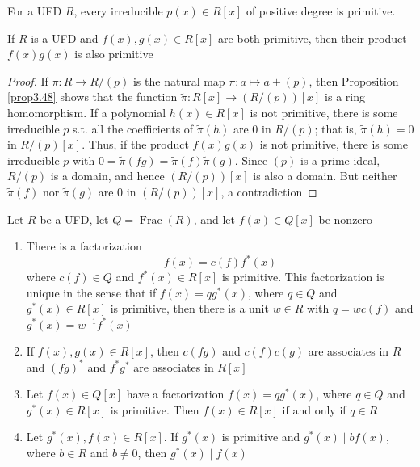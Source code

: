\documentclass[11pt]{article}
\DeclareMathOperator{\Frac}{Frac}
\begin{document}
\begin{examplle}[]
For a UFD \(R\), every irreducible \(p(x)\in R[x]\) of positive degree is
primitive. 
\end{examplle}

\begin{lemma}
If \(R\) is a UFD and \(f(x),g(x)\in R[x]\) are both primitive, then their
product \(f(x)g(x)\) is also primitive
\end{lemma}

\begin{proof}
If \(\pi:R\to R/(p)\) is the natural map \(\pi:a\mapsto a+(p)\), then Proposition
\ref{prop3.48} shows that the function \(\widetilde{\pi}:R[x]\to(R/(p))[x]\) is a
ring homomorphism. If a polynomial \(h(x)\in R[x]\) is not primitive, there is
some irreducible \(p\) s.t. all the coefficients of \(\widetilde{\pi}(h)\) are 0
in \(R/(p)\); that is, \(\widetilde{\pi}(h)=0\) in \(R/(p)[x]\). Thus, if the
product \(f(x)g(x)\) is not primitive, there is some irreducible \(p\) with 
\(0=\widetilde{\pi}(fg)=\widetilde{\pi}(f)\widetilde{\pi}(g)\). Since \((p)\) is a
prime ideal, \(R/(p)\) is a domain, and hence \((R/(p))[x]\) is also a
domain. But neither \(\widetilde{\pi}(f)\) nor \(\widetilde{\pi}(g)\) are 0 in
\((R/(p))[x]\), a contradiction
\end{proof}

\begin{lemma}[]
\label{lemma6.24}
Let \(R\) be a UFD, let \(Q=\Frac(R)\), and let \(f(x)\in Q[x]\) be nonzero
\begin{enumerate}
\item There is a factorization
\begin{equation*}
f(x)=c(f)f^*(x)
\end{equation*}
where \(c(f)\in Q\) and \(f^*(x)\in R[x]\) is primitive. This
factorization is unique in the sense that if \(f(x)=qg^*(x)\), where
\(q\in Q\) and \(g^*(x)\in R[x]\) is primitive, then there is a unit 
\(w\in R\) with \(q=wc(f)\) and \(g^*(x)=w^{-1}f^*(x)\)
\item If \(f(x),g(x)\in R[x]\), then \(c(fg)\) and \(c(f)c(g)\) are associates
in \(R\) and \((fg)^*\) and \(f^*g^*\) are associates in \(R[x]\)
\item Let \(f(x)\in Q[x]\) have a factorization \(f(x)=qg^*(x)\), where 
\(q\in Q\) and \(g^*(x)\in R[x]\) is primitive. Then \(f(x)\in R[x]\) if
and only if \(q\in R\)
\item Let \(g^*(x),f(x)\in R[x]\). If \(g^*(x)\) is primitive and 
\(g^*(x)\mid b f(x)\), where \(b\in R\) and \(b\neq0\), then 
\(g^*(x)\mid f(x)\)
\end{enumerate}
\end{lemma}
\end{document}
